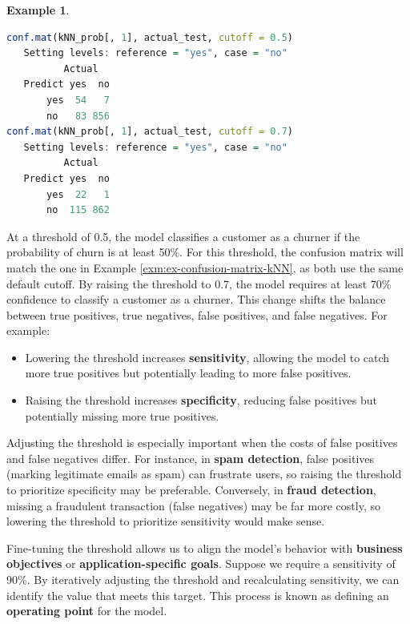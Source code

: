 \documentclass[
]{book}
\providecommand{\tightlist}{%
  \setlength{\itemsep}{0pt}\setlength{\parskip}{0pt}}
\theoremstyle{definition}
\theoremstyle{definition}
\newtheorem{example}{Example}[chapter]
\theoremstyle{definition}
\theoremstyle{definition}
\theoremstyle{remark}
\begin{document}
\begin{example}
\begin{lstlisting}[language=R]
conf.mat(kNN_prob[, 1], actual_test, cutoff = 0.5)
   Setting levels: reference = "yes", case = "no"
          Actual
   Predict yes  no
       yes  54   7
       no   83 856
conf.mat(kNN_prob[, 1], actual_test, cutoff = 0.7)
   Setting levels: reference = "yes", case = "no"
          Actual
   Predict yes  no
       yes  22   1
       no  115 862
\end{lstlisting}

At a threshold of 0.5, the model classifies a customer as a churner if the probability of churn is at least 50\%. For this threshold, the confusion matrix will match the one in Example \ref{exm:ex-confusion-matrix-kNN}, as both use the same default cutoff. By raising the threshold to 0.7, the model requires at least 70\% confidence to classify a customer as a churner. This change shifts the balance between true positives, true negatives, false positives, and false negatives. For example:

\begin{itemize}
\tightlist
\item
  Lowering the threshold increases \textbf{sensitivity}, allowing the model to catch more true positives but potentially leading to more false positives.\\
\item
  Raising the threshold increases \textbf{specificity}, reducing false positives but potentially missing more true positives.
\end{itemize}

Adjusting the threshold is especially important when the costs of false positives and false negatives differ. For instance, in \textbf{spam detection}, false positives (marking legitimate emails as spam) can frustrate users, so raising the threshold to prioritize specificity may be preferable. Conversely, in \textbf{fraud detection}, missing a fraudulent transaction (false negatives) may be far more costly, so lowering the threshold to prioritize sensitivity would make sense.
\end{example}

Fine-tuning the threshold allows us to align the model's behavior with \textbf{business objectives} or \textbf{application-specific goals}. Suppose we require a sensitivity of 90\%. By iteratively adjusting the threshold and recalculating sensitivity, we can identify the value that meets this target. This process is known as defining an \textbf{operating point} for the model.
\end{document}
